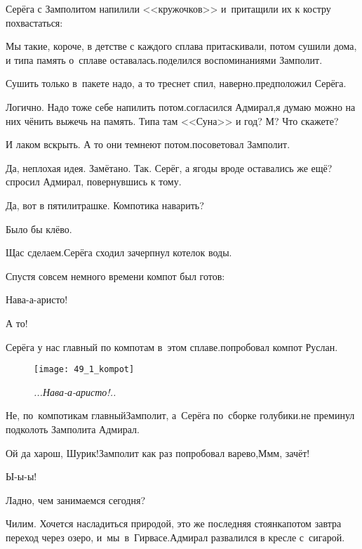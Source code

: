 Серёга с Замполитом напилили <<кружочков>> и~притащили их к костру похвастаться:

\diagdash Мы такие, короче, в детстве с каждого сплава притаскивали, потом сушили дома, и типа память о~сплаве оставалась.\mdash поделился воспоминаниями Замполит.

\diagdash Сушить только в~пакете надо, а то треснет спил, наверно.\mdash предположил Серёга.

\diagdash Логично. Надо тоже себе напилить потом.\mdash согласился Адмирал,\mdash я думаю можно на них чё\sdash нить выжечь на память. Типа там <<Суна>> и год? М? Что скажете?

\diagdash И лаком вскрыть. А то они темнеют потом.\mdash посоветовал Замполит.

\diagdash Да, неплохая идея. Замётано. Так. Серёг, а ягоды вроде оставались же ещё?\mdash спросил Адмирал, повернувшись к тому.

\diagdash Да, вот в пятилитрашке. Компотика наварить?

\diagdash Было бы клёво.

\diagdash Щас сделаем.\mdash Серёга сходил зачерпнул котелок воды.

Спустя совсем немного времени компот был готов:

\diagdash Нава-а-аристо!

\diagdash А то!

\diagdash Серёга у нас главный по компотам в~этом сплаве.\mdash попробовал компот Руслан.

\begin{wrapfigure}[10]{r}{0.51\textwidth}
	\centering
	\texttt{[image: 49\_1\_kompot]}
	\caption{\small\textit{...Нава-а-аристо!..}}
\end{wrapfigure}

\diagdash Не, по~компотикам главный\mdash Замполит, а~Серёга по~сборке голубики.\mdash не преминул подколоть Замполита Адмирал.

\diagdash Ой да харош, Шурик!\mdash Замполит как раз попробовал варево,\mdash М\sdash м\sdash м, зачёт!

\diagdash Ы-ы-ы!

\newpage
\diagdash Ладно, чем занимаемся сегодня?

\diagdash Чилим. Хочется насладиться природой, это же последняя стоянка\mdash потом завтра переход через озеро, и~мы~в~Гирвасе.\mdash Адмирал развалился в кресле с~сигарой.


